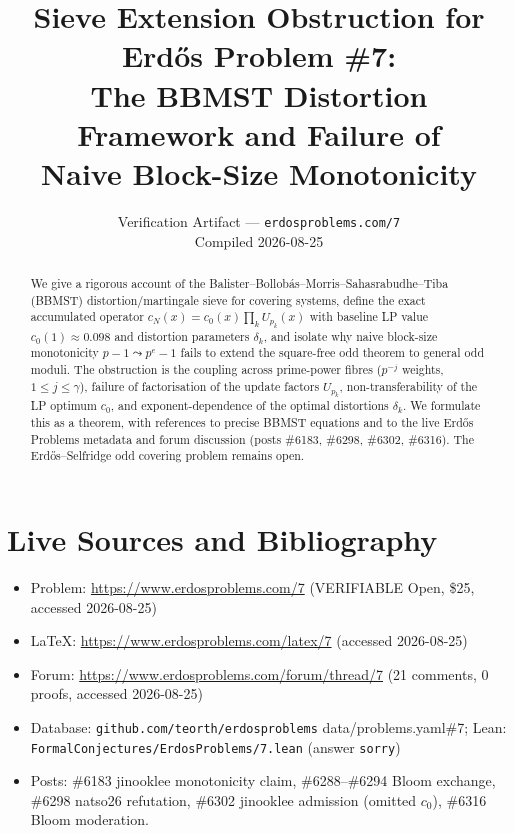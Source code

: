 \documentclass[11pt,a4paper]{article}
\title{Sieve Extension Obstruction for Erd\H{o}s Problem \#7:\\
The BBMST Distortion Framework and Failure of\\ Naive Block-Size Monotonicity}
\author{Verification Artifact --- \texttt{erdosproblems.com/7}\\
Compiled 2026-08-25}
\date{}
\theoremstyle{plain}
\theoremstyle{definition}
\theoremstyle{remark}
\newcommand{\cN}{c_N}
\newcommand{\cO}{c_0}
\begin{document}
\maketitle
\begin{abstract}
We give a rigorous account of the Balister--Bollob\'as--Morris--Sahasrabudhe--Tiba (BBMST) distortion/martingale sieve for covering systems, define the exact accumulated operator $\cN(x)=\cO(x)\prod_{k}U_{p_{k}}(x)$ with baseline LP value $\cO(1)\approx0.098$ and distortion parameters $\delta_{k}$, and isolate why naive block-size monotonicity $p-1\leadsto p^{e}-1$ fails to extend the square-free odd theorem to general odd moduli. The obstruction is the coupling across prime-power fibres ($p^{-j}$ weights, $1\le j\le\gamma$), failure of factorisation of the update factors $U_{p_{k}}$, non-transferability of the LP optimum $\cO$, and exponent-dependence of the optimal distortions $\delta_{k}$. We formulate this as a theorem, with references to precise BBMST equations and to the live Erd\H{o}s Problems metadata and forum discussion (posts \#6183, \#6298, \#6302, \#6316). The Erd\H{o}s--Selfridge odd covering problem remains open.
\end{abstract}
\tableofcontents
\newpage

\section{Live Sources and Bibliography}

\begin{itemize}
\item Problem: \url{https://www.erdosproblems.com/7} (VERIFIABLE Open, \$25, accessed 2026-08-25)
\item \LaTeX: \url{https://www.erdosproblems.com/latex/7} (accessed 2026-08-25)
\item Forum: \url{https://www.erdosproblems.com/forum/thread/7} (21 comments, 0 proofs, accessed 2026-08-25)
\item Database: \texttt{github.com/teorth/erdosproblems} data/problems.yaml\#7; Lean: \texttt{FormalConjectures/ErdosProblems/7.lean} (answer \texttt{sorry})
\item Posts: \#6183 jinooklee monotonicity claim, \#6288--\#6294 Bloom exchange, \#6298 natso26 refutation, \#6302 jinooklee admission (omitted $\cO$), \#6316 Bloom moderation.
\end{itemize}
\end{document}
